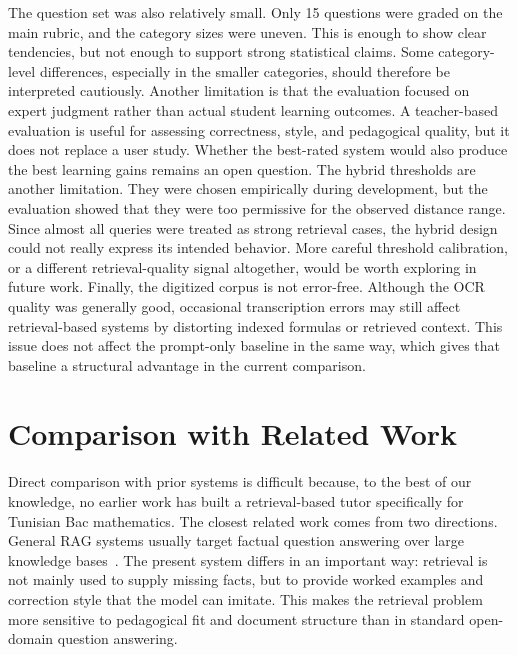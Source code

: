 The question set was also relatively small. Only 15 questions were graded on
the main rubric, and the category sizes were uneven. This is enough to show
clear tendencies, but not enough to support strong statistical claims.
Some category-level differences, especially in the smaller categories,
should therefore be interpreted cautiously.
Another limitation is that the evaluation focused on expert judgment rather
than actual student learning outcomes. A teacher-based evaluation is useful
for assessing correctness, style, and pedagogical quality, but it does not
replace a user study. Whether the best-rated system would also produce the
best learning gains remains an open question.
The hybrid thresholds are another limitation. They were chosen empirically
during development, but the evaluation showed that they were too permissive
for the observed distance range. Since almost all queries were treated as
strong retrieval cases, the hybrid design could not really express its
intended behavior. More careful threshold calibration, or a different
retrieval-quality signal altogether, would be worth exploring in future
work.
Finally, the digitized corpus is not error-free. Although the OCR quality
was generally good, occasional transcription errors may still affect
retrieval-based systems by distorting indexed formulas or retrieved context.
This issue does not affect the prompt-only baseline in the same way, which
gives that baseline a structural advantage in the current comparison.

\section{Comparison with Related Work}
\label{sec:comparison-related-work}

Direct comparison with prior systems is difficult because, to the best of
our knowledge, no earlier work has built a retrieval-based tutor
specifically for Tunisian Bac mathematics.
The closest related work comes from two directions. General RAG systems
usually target factual question answering over large knowledge
bases~\cite{gao2024rag_survey}. The present system differs in an important
way: retrieval is not mainly used to supply missing facts, but to provide
worked examples and correction style that the model can imitate. This makes
the retrieval problem more sensitive to pedagogical fit and document
structure than in standard open-domain question answering.


